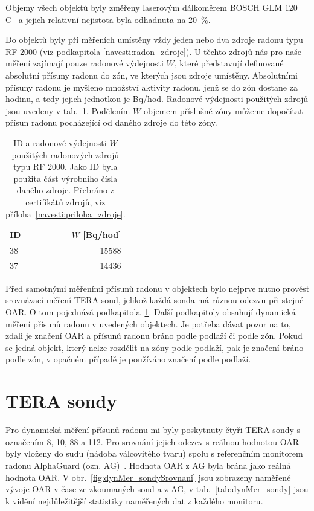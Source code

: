Objemy všech objektů byly změřeny laserovým dálkoměrem BOSCH GLM 120 C~\cite{dalkomer} a jejich relativní nejistota byla odhadnuta na 20~\%.

Do objektů byly při měřeních umístěny vždy jeden nebo dva zdroje radonu typu RF 2000 (viz podkapitola \ref{navesti:radon_zdroje}). U těchto zdrojů nás pro naše měření zajímají pouze radonové výdejnosti $W$, které představují definované absolutní přísuny radonu do zón, ve kterých jsou zdroje umístěny. Absolutními přísuny radonu je myšleno množství aktivity radonu, jenž se do zón dostane za hodinu, a tedy jejich jednotkou je \si{Bq/hod}. Radonové výdejnosti použitých zdrojů jsou uvedeny v tab.~\ref{tab:dynMer_zdroje}. Podělením $W$ objemem příslušné zóny můžeme dopočítat přísun radonu pocházející od daného zdroje do této zóny. 
\begin{table}[ht]
    \centering
    \caption{ID a radonové výdejnosti $W$ použitých radonových zdrojů typu RF 2000. Jako ID byla použita část výrobního čísla daného zdroje. Přebráno z certifikátů zdrojů, viz příloha~\ref{navesti:priloha_zdroje}.}
    \label{tab:dynMer_zdroje}
    \begin{tabular}{lr}
        \toprule
        ID & $W$ [\si{Bq/hod}]\\
        \midrule
        38 & 15588\\
        37 & 14436\\
        \bottomrule
    \end{tabular}
\end{table}

Před samotnými měřeními přísunů radonu v objektech bylo nejprve nutno provést srovnávací měření TERA sond, jelikož každá sonda má různou odezvu při stejné OAR. O tom pojednává podkapitola~\ref{navesti:dynMer_TERA}. Další podkapitoly obsahují dynamická měření přísunů radonu v uvedených objektech. Je potřeba dávat pozor na to, zdali je značení OAR a přísunů radonu bráno podle podlaží či podle zón. Pokud se jedná objekt, který nelze rozdělit na zóny podle podlaží, pak je značení bráno podle zón, v opačném případě je používáno značení podle podlaží.

\section{TERA sondy}\label{navesti:dynMer_TERA}

Pro dynamická měření přísunů radonu mi byly poskytnuty čtyři TERA sondy s označením 8, 10, 88 a 112. Pro srovnání jejich odezev s reálnou hodnotou OAR byly vloženy do sudu (nádoba válcovitého tvaru) spolu s referenčním monitorem radonu AlphaGuard (ozn. AG)~\cite{alphaguard}. Hodnota OAR z AG byla brána jako reálná hodnota OAR. V obr.~\ref{fig:dynMer_sondySrovnani} jsou zobrazeny naměřené vývoje OAR v čase ze zkoumaných sond a z AG, v tab.~\ref{tab:dynMer_sondy} jsou k vidění nejdůležitější statistiky naměřených dat z každého monitoru.

